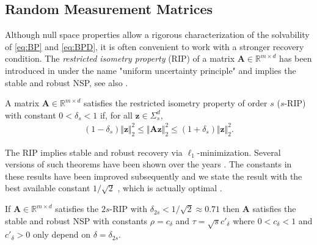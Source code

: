 \documentclass{svproc}
\newcommand{\bA}{\boldsymbol{A}}
\newcommand{\bz}{\boldsymbol{z}}
\newcommand{\0}{\boldsymbol{0}}
\newcommand{\1}{\boldsymbol{1}}
\def\R{\mathbb{R}}
\begin{document}
\subsection{Random Measurement Matrices}

Although null space properties allow a rigorous characterization of the solvability of \eqref{eq:BP} and \eqref{eq:BPD}, it is often convenient to work with a stronger recovery condition. The \emph{restricted isometry property} (RIP) of a matrix $\bA \in \R^{m\times d}$ has been introduced in \cite{candes2006near} under the name "uniform uncertainty principle" and implies the stable and robust NSP, see also \cite[Definition 6.1]{foucart2013mathematical}.


\begin{definition} \label{def:RIP}
	A matrix $\bA \in \R^{m\times d}$ satisfies the restricted isometry property of order $s$ ($s$-RIP) with constant $0 < \delta_s < 1$ if, for all $\bz \in \Sigma_s^d$,
	 \begin{align} \label{eq:RIP2}
	 (1-\delta_s) \Vert \bz \Vert_2^2 \le \Vert \bA\bz \Vert_2^2 \le (1+\delta_s) \Vert \bz \Vert_2^2.
	 \end{align}
\end{definition}



The RIP implies stable and robust recovery via $\ell_1$-minimization.
Several versions of such theorems have been shown over the years \cite{cata05,carota06-1,ca08,cawaxu10,foucart2013mathematical,cazh14}. %
The constants in these results have been improved subsequently and we state the result with the best available constant $1/\sqrt{2}$ \cite{cazh14}, which is actually optimal \cite{dagr09}.

\begin{theorem}
\label{thm:RIP}
    If $\bA \in \R^{m\times d}$ satisfies the $2s$-RIP with %
    $\delta_{2s} < 1/\sqrt{2} \approx 0.71$ then
    $\bA$ satisfies the stable and robust NSP with constants $\rho = c_\delta$ and $\tau = \sqrt{s} c'_\delta$ where $0 < c_\delta < 1$ and $c'_\delta > 0$ only depend on $\delta=\delta_{2s}$.
\end{theorem}
\end{document}
